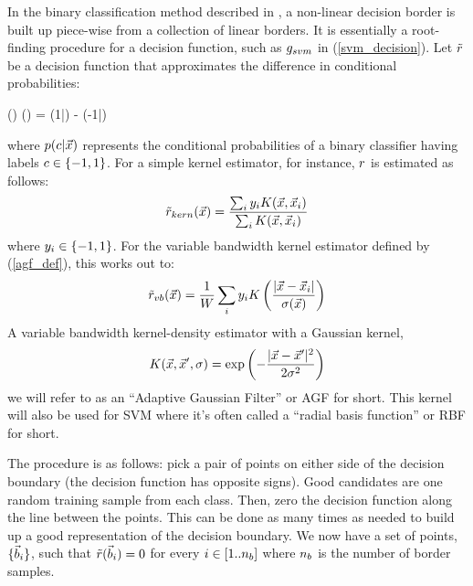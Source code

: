 In the binary classification method described in \citet{Mills2011},
a non-linear decision border is built up piece-wise from a collection of linear borders.
It is essentially a root-finding procedure for a decision function,
such as $g_{svm}$ in (\ref{svm_decision}).
Let $\tilde r$ be a decision function
that approximates the difference in conditional probabilities:
\begin{eqnnon}
	\decisionfunction(\point) \approx \diffcondprob(\point) = 
	\condprob(1|\point) - \condprob(-1|\point)
	\label{rdef}
\end{eqnnon}
where $p(c|\vec {x})$ represents the conditional probabilities of
a binary classifier having labels $c \in \lbrace -1, 1 \rbrace$.
For a simple kernel estimator, for instance, 
$r$ is estimated as follows:
\begin{equation}
	\tilde r_{kern}(\vec {x}) = \frac{\sum_i y_i K(\vec {x}, \vec {x}_i)}{\sum_i K(\vec {x}, \vec {x}_i)}
	\label{kernel_decision}
\end{equation}
where $y_i \in \lbrace -1, 1 \rbrace$.
For the variable bandwidth kernel estimator defined by (\ref{agf_def}), this works out to:
\begin{equation}
	\tilde r_{vb}(\vec {x}) = \frac{1}{W} \sum_i y_i K \left (\frac{|\vec {x} - \vec {x}_i|}{\sigma(\vec {x})} \right )
	\label{vb_kernel_r}
\end{equation}
A variable bandwidth kernel-density estimator with a Gaussian kernel,
\begin{equation}
	K(\vec {x}, \vec {x}^\prime, \sigma) = \exp \left ( - \frac{|\vec {x} - \vec {x}^\prime|^2}{2 \sigma^2} \right )
	\label{Gaussian_kernel}
\end{equation}
we will refer to as an ``Adaptive Gaussian Filter'' or AGF for short.
This kernel will also be used for SVM where it's often called a ``radial
basis function'' or RBF for short.

The procedure is as follows: pick a pair of points on either side of the decision
boundary (the decision function has opposite signs). Good candidates are one
random training sample from each class. Then, zero the decision function
along the line between the points. This can be done as many times as needed
to build up a good representation of the decision boundary.
We now have a set of points, $\lbrace \vec b_i \rbrace$, such that
$\tilde r(\vec b_i)=0$ for every $i \in [1..n_b]$ where
$n_b$ is the number of border samples.

